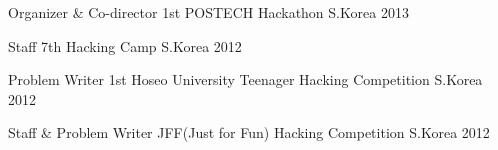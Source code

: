 


\begin{cvhonors}


\cvhonor
{Organizer \& Co-director} %
{1st POSTECH Hackathon} %
{S.Korea} %
{2013} %
    

\cvhonor
{Staff} %
{7th Hacking Camp} %
{S.Korea} %
{2012} %


\cvhonor
{Problem Writer} %
{1st Hoseo University Teenager Hacking Competition} %
{S.Korea} %
{2012} %


\cvhonor
{Staff \& Problem Writer} %
{JFF(Just for Fun) Hacking Competition} %
{S.Korea} %
{2012} %


\end{cvhonors}